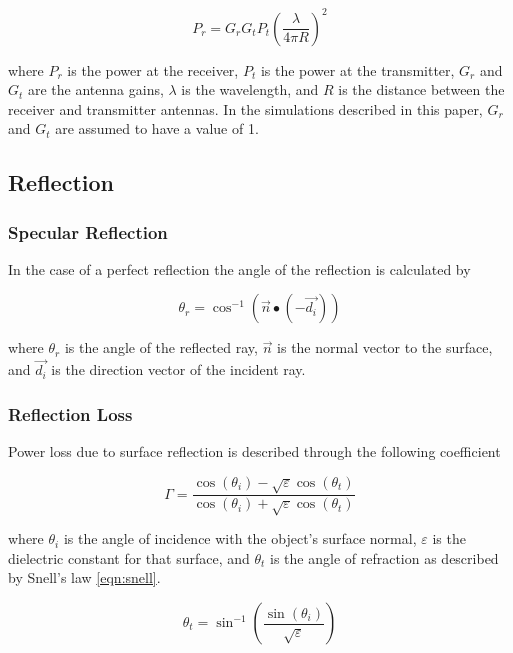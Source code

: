 \begin{equation}
	 P_r = G_r G_t P_t \left (\frac{\lambda}{4\pi R}\right)^2
	 \label{eqn:FSPL}
\end{equation}

where $P_r $ is the power at the receiver, $P_t$ is the power at the transmitter, $G_r$ and $G_t$ are the antenna gains, 
$\lambda$ is the wavelength, and $R$ is the distance between the receiver and transmitter antennas. In the simulations described in this paper, $G_r$ and $G_t$ are assumed to have a value of 1.

\subsection{Reflection}

\subsubsection{Specular Reflection}
In the case of a perfect reflection the angle of the reflection is calculated by

\begin{equation}
	\theta_r = \cos^{-1}(\vec{n} \bullet (-\vec{d_i}))
	\label{eqn:spec}
\end{equation}

where $\theta_r$ is the angle of the reflected ray, $\vec{n}$ is the normal vector to the surface, and $\vec{d_i}$ is the direction vector of the incident ray.

\subsubsection{Reflection Loss}
Power loss due to surface reflection is described through the following coefficient

\begin{equation}
	\Gamma = \frac{\cos(\theta_i) - \sqrt{\varepsilon}\cos(\theta_t)}{\cos(\theta_i) + \sqrt{\varepsilon}\cos(\theta_t)}
	\label{eqn:RL}
\end{equation}

where $\theta_i$ is the angle of incidence with the object's surface normal, $\varepsilon$ is the dielectric constant for that surface, and $\theta_t$ is the angle of refraction as described by Snell's law \ref{eqn:snell}.

\begin{equation}
	\theta_t = \sin^{-1}\left(\frac{\sin(\theta_i)}{\sqrt{\varepsilon}} \right)
	\label{eqn:snell}
\end{equation}

